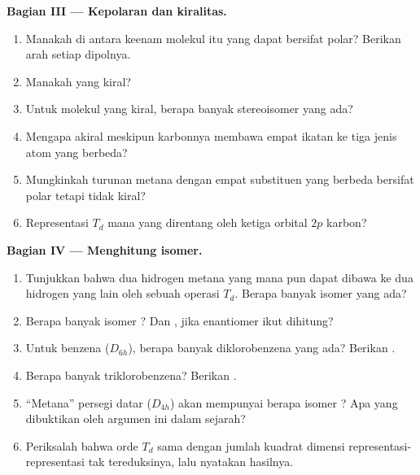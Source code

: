 \begin{problem}
\medskip\noindent\textbf{Bagian III --- Kepolaran dan kiralitas.}
\begin{enumerate}[resume, beginpenalty=10000]
  \item Manakah di antara keenam molekul itu yang dapat bersifat polar?
        Berikan arah setiap dipolnya.
  \item Manakah yang kiral?
  \item Untuk molekul yang kiral, berapa banyak stereoisomer yang ada?
  \item Mengapa  akiral meskipun karbonnya membawa empat ikatan
        ke tiga jenis atom yang berbeda?
  \item Mungkinkah turunan metana dengan empat substituen yang berbeda
        bersifat polar tetapi tidak kiral?
  \item Representasi $T_d$ mana yang direntang oleh ketiga orbital $2p$
        karbon?
\end{enumerate}

\medskip\noindent\textbf{Bagian IV --- Menghitung isomer.}
\begin{enumerate}[resume, beginpenalty=10000]
  \item Tunjukkan bahwa dua hidrogen metana yang mana pun dapat dibawa ke dua
        hidrogen yang lain oleh sebuah operasi $T_d$. Berapa banyak isomer
         yang ada?
  \item Berapa banyak isomer ? Dan , jika enantiomer
        ikut dihitung?
  \item Untuk benzena ($D_{6h}$), berapa banyak diklorobenzena yang ada?
        Berikan .
  \item Berapa banyak triklorobenzena? Berikan .
  \item ``Metana'' persegi datar ($D_{4h}$) akan mempunyai berapa isomer
        ? Apa yang dibuktikan oleh argumen ini dalam sejarah?
  \item Periksalah bahwa orde $T_d$ sama dengan jumlah kuadrat dimensi
        representasi-representasi tak tereduksinya, lalu nyatakan hasilnya.
\end{enumerate}
\end{problem}
